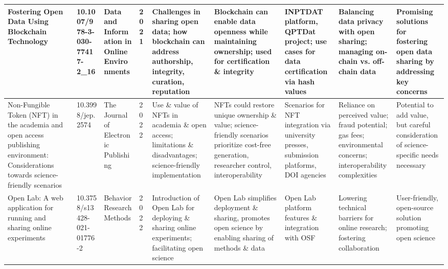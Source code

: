 \documentclass{article}
\begin{document}
\begin{landscape}
\begin{tabularx}{\linewidth}{|p{3.5cm}|p{2.5cm}|p{3cm}|p{1.8cm}|X|X|X|X|X|}
        Fostering Open Data Using Blockchain Technology                                                                                    & 10.1007/978-3-030-77417-2\_16   & Data and Information in Online Environments                                   & 2021                      & Challenges in sharing open data; how blockchain can address authorship, integrity, curation, reputation                     & Blockchain can enable data openness while maintaining ownership; used for certification \& integrity                                           & INPTDAT platform, QPTDat project; use cases for data certification via hash values                      & Balancing data privacy with open sharing; managing on-chain vs. off-chain data                                                      & Promising solutions for fostering open data sharing by addressing key concerns                        \\
        \hline

        Non-Fungible Token (NFT) in the academia and open access publishing environment: Considerations towards science-friendly scenarios & 10.3998/jep.2574                & The Journal of Electronic Publishing                                          & 2022                      & Use \& value of NFTs in academia \& open access; limitations \& disadvantages; science-friendly implementation              & NFTs could restore unique ownership \& value; science-friendly scenarios prioritize cost-free generation, researcher control, interoperability & Scenarios for NFT integration via university presses, submission platforms, DOI agencies                & Reliance on perceived value; fraud potential; gas fees; environmental concerns; interoperability complexities                       & Potential to add value, but careful consideration of science-specific needs necessary                 \\
        \hline

        Open Lab: A web application for running and sharing online experiments                                                             & 10.3758/s13428-021-01776-2      & Behavior Research Methods                                                     & 2022                      & Introduction of Open Lab for deploying \& sharing online experiments; facilitating open science                             & Open Lab simplifies deployment \& sharing, promotes open science by enabling sharing of methods \& data                                        & Open Lab platform features \& integration with OSF                                                      & Lowering technical barriers for online research; fostering collaboration                                                            & User-friendly, open-source solution promoting open science                                            \\
        \hline


\end{tabularx}
\end{landscape}
\end{document}
